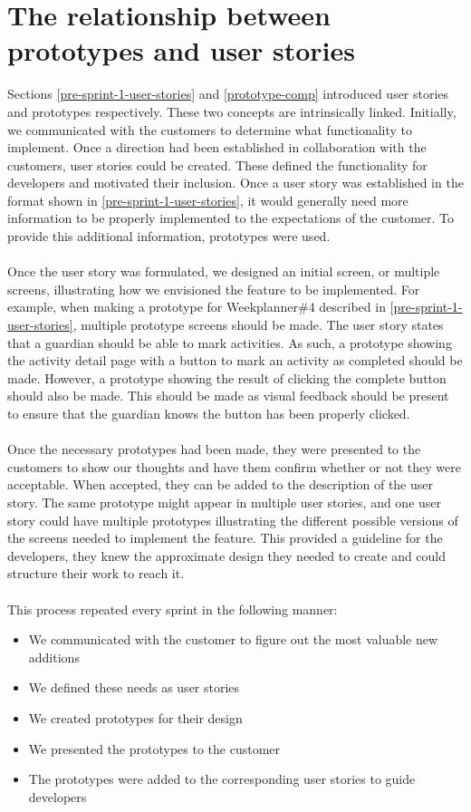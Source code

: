 \section{The relationship between prototypes and user stories}
Sections \ref{pre-sprint-1-user-stories} and \ref{prototype-comp} introduced user stories and prototypes respectively.
These two concepts are intrinsically linked.
Initially, we communicated with the customers to determine what functionality to implement. 
Once a direction had been established in collaboration with the customers, user stories could be created.
These defined the functionality for developers and motivated their inclusion.
Once a user story was established in the format shown in \autoref{pre-sprint-1-user-stories}, it would generally need more information to be properly implemented to the expectations of the customer.
To provide this additional information, prototypes were used.
\\\\
Once the user story was formulated, we designed an initial screen, or multiple screens, illustrating how we envisioned the feature to be implemented.
For example, when making a prototype for Weekplanner\#4 described in \autoref{pre-sprint-1-user-stories}, multiple prototype screens should be made.
The user story states that a guardian should be able to mark activities. 
As such, a prototype showing the activity detail page with a button to mark an activity as completed should be made.
However, a prototype showing the result of clicking the complete button should also be made.
This should be made as visual feedback should be present to ensure that the guardian knows the button has been properly clicked.
\\\\
Once the necessary prototypes had been made, they were presented to the customers to show our thoughts and have them confirm whether or not they were acceptable.
When accepted, they can be added to the description of the user story.
The same prototype might appear in multiple user stories, and one user story could have multiple prototypes illustrating the different possible versions of the screens needed to implement the feature.
This provided a guideline for the developers, they knew the approximate design they needed to create and could structure their work to reach it.
\\\\
This process repeated every sprint in the following manner:
\begin{itemize}
    \item We communicated with the customer to figure out the most valuable new additions
    \item We defined these needs as user stories
    \item We created prototypes for their design
    \item We presented the prototypes to the customer
    \item The prototypes were added to the corresponding user stories to guide developers
\end{itemize}
